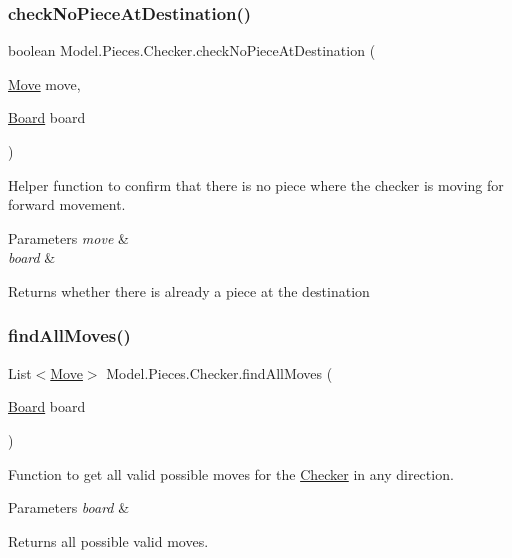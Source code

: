 \subsubsection{\texorpdfstring{check\+No\+Piece\+At\+Destination()}{checkNoPieceAtDestination()}}
{\footnotesize\ttfamily boolean Model.\+Pieces.\+Checker.\+check\+No\+Piece\+At\+Destination (\begin{DoxyParamCaption}\item[{\hyperlink{class_model_1_1_move}{Move}}]{move,  }\item[{\hyperlink{class_model_1_1_board}{Board}}]{board }\end{DoxyParamCaption})}

Helper function to confirm that there is no piece where the checker is moving for forward movement. 
\begin{DoxyParams}{Parameters}
{\em move} & \\
\hline
{\em board} & \\
\hline
\end{DoxyParams}
\begin{DoxyReturn}{Returns}
whether there is already a piece at the destination 
\end{DoxyReturn}
\hypertarget{class_model_1_1_pieces_1_1_checker_a840159766272906e7d72551c92623eee}{}\label{class_model_1_1_pieces_1_1_checker_a840159766272906e7d72551c92623eee} 
\subsubsection{\texorpdfstring{find\+All\+Moves()}{findAllMoves()}}
{\footnotesize\ttfamily List$<$\hyperlink{class_model_1_1_move}{Move}$>$ Model.\+Pieces.\+Checker.\+find\+All\+Moves (\begin{DoxyParamCaption}\item[{\hyperlink{class_model_1_1_board}{Board}}]{board }\end{DoxyParamCaption})}

Function to get all valid possible moves for the \hyperlink{class_model_1_1_pieces_1_1_checker}{Checker} in any direction. 
\begin{DoxyParams}{Parameters}
{\em board} & \\
\hline
\end{DoxyParams}
\begin{DoxyReturn}{Returns}
all possible valid moves. 
\end{DoxyReturn}
\hypertarget{class_model_1_1_pieces_1_1_checker_a493190714612bdc8125c475b41434c75}{}\label{class_model_1_1_pieces_1_1_checker_a493190714612bdc8125c475b41434c75} 
